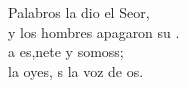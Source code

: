 \begin{cancion}[La Palabra][]%
	 Palabros la dio el Seor,\\
	y los hombres apagaron su .\\
	a es,nete y somoss;\\
	 la oyes, s la voz de os.\\
\end{cancion}%
